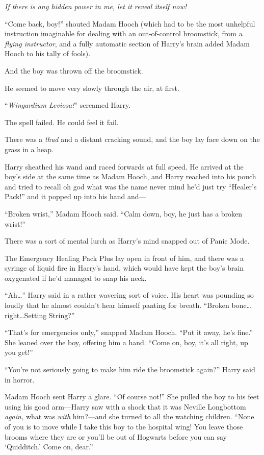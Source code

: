 \emph{If there is any hidden power in me, let it reveal itself \emph{now}!}

“Come back, boy!” shouted Madam Hooch (which had to be the most unhelpful instruction imaginable for dealing with an out-of-control broomstick, from a \emph{flying instructor}, and a fully automatic section of Harry’s brain added Madam Hooch to his tally of fools).

And the boy was thrown off the broomstick.

He seemed to move very slowly through the air, at first.

“\emph{Wingardium Leviosa!}” screamed Harry.

The spell failed. He could feel it fail.

There was a \emph{thud} and a distant cracking sound, and the boy lay face down on the grass in a heap.

Harry sheathed his wand and raced forwards at full speed. He arrived at the boy’s side at the same time as Madam Hooch, and Harry reached into his pouch and tried to recall oh god what was the name never mind he’d just try “Healer’s Pack!” and it popped up into his hand and—

“Broken wrist,” Madam Hooch said. “Calm down, boy, he just has a broken wrist!”

There was a sort of mental lurch as Harry’s mind snapped out of Panic Mode.

The Emergency Healing Pack Plus lay open in front of him, and there was a syringe of liquid fire in Harry’s hand, which would have kept the boy’s brain oxygenated if he’d managed to snap his neck.

“Ah…” Harry said in a rather wavering sort of voice. His heart was pounding so loudly that he almost couldn’t hear himself panting for breath. “Broken bone…right…Setting String?”

“That’s for emergencies only,” snapped Madam Hooch. “Put it away, he’s fine.” She leaned over the boy, offering him a hand. “Come on, boy, it’s all right, up you get!”

“You’re not seriously going to make him ride the broomstick again?” Harry said in horror.

Madam Hooch sent Harry a glare. “Of course not!” She pulled the boy to his feet using his good arm—Harry saw with a shock that it was Neville Longbottom \emph{again,} what was \emph{with} him?—and she turned to all the watching children. “None of you is to move while I take this boy to the hospital wing! You leave those brooms where they are or you’ll be out of Hogwarts before you can say ‘Quidditch.’ Come on, dear.”

